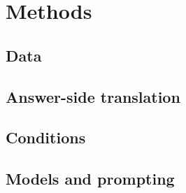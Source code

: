 \section{Methods}
\label{sec:methods}


\subsection{Data}

\subsection{Answer-side translation}

\subsection{Conditions}
\label{sec:conditions}

\subsection{Models and prompting}

